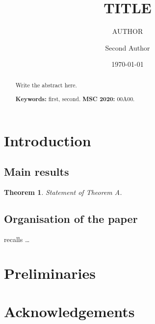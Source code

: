 \documentclass[11pt]{article}
\title{{{TITLE}}}
\author[1]{{{AUTHOR}}}
\author[2]{Second Author}
\affil[1]{Department of Mathematics, First University}
\affil[2]{Institute, Second University}
\date{\today}
\theoremstyle{plain}
\newtheorem{theorem}{Theorem}[section]
\theoremstyle{definition}
\theoremstyle{remark}
\begin{document}
\maketitle
\begin{abstract}
Write the abstract here.

\medskip\noindent\textbf{Keywords:} first, second. \quad \textbf{MSC 2020:} 00A00.
\end{abstract}

\section{Introduction}
\subsection*{Main results}
\begin{theorem}\label{thm:A}
Statement of Theorem A.
\end{theorem}
\subsection*{Organisation of the paper}
 recalls \dots

\section{Preliminaries}\label{sec:prelim}

\section*{Acknowledgements}



\end{document}
